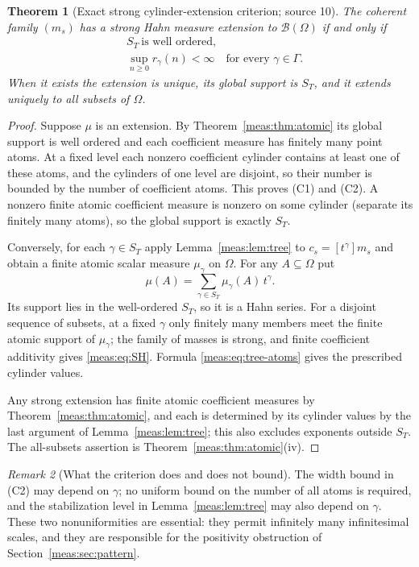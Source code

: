 \documentclass[11pt]{article}
\numberwithin{equation}{section}
\newtheorem{theorem}{Theorem}[section]
\theoremstyle{definition}
\theoremstyle{remark}
\newtheorem{remark}[theorem]{Remark}
\newcommand{\B}{\mathcal B}
\newcommand{\coef}[2]{[t^{#1}]#2}
\begin{document}
\begin{theorem}[Exact strong cylinder-extension criterion; source 10]
\label{meas:thm:cylinder}
The coherent family $(m_s)$ has a strong Hahn measure extension to
$\B(\Omega)$ if and only if
\begin{align}
 &S_T\ \text{is well ordered},\label{meas:eq:C1}\tag{C1}\\
 &\sup_{n\ge0}r_\gamma(n)<\infty\quad\text{for every }\gamma\in\Gamma.
 \label{meas:eq:C2}\tag{C2}
\end{align}
When it exists the extension is unique, its global support is $S_T$, and it
extends uniquely to all subsets of $\Omega$.
\end{theorem}
\begin{proof}
Suppose $\mu$ is an extension. By Theorem~\ref{meas:thm:atomic} its global
support is well ordered and each coefficient measure has finitely many point
atoms. At a fixed level each nonzero coefficient cylinder contains at least
one of these atoms, and the cylinders of one level are disjoint, so their
number is bounded by the number of coefficient atoms. This proves (C1) and
(C2). A nonzero finite atomic coefficient measure is nonzero on some cylinder
(separate its finitely many atoms), so the global support is exactly $S_T$.

Conversely, for each $\gamma\in S_T$ apply Lemma~\ref{meas:lem:tree} to
$c_s=\coef{\gamma}{m_s}$ and obtain a finite atomic scalar measure $\mu_\gamma$ on
$\Omega$. For any $A\subseteq\Omega$ put
\begin{equation}\label{meas:eq:construct-extension}
 \mu(A)=\sum_{\gamma\in S_T}\mu_\gamma(A)\,t^\gamma.
\end{equation}
Its support lies in the well-ordered $S_T$, so it is a Hahn series. For a
disjoint sequence of subsets, at a fixed $\gamma$ only finitely many members
meet the finite atomic support of $\mu_\gamma$; the family of masses is strong,
and finite coefficient additivity gives \eqref{meas:eq:SH}. Formula
\eqref{meas:eq:tree-atoms} gives the prescribed cylinder values.

Any strong extension has finite atomic coefficient measures by
Theorem~\ref{meas:thm:atomic}, and each is determined by its cylinder values
by the last argument of Lemma~\ref{meas:lem:tree}; this also excludes exponents
outside $S_T$. The all-subsets assertion is
Theorem~\ref{meas:thm:atomic}(iv).
\end{proof}

\begin{remark}[What the criterion does and does not bound]
The width bound in (C2) may depend on $\gamma$; no uniform bound on the number
of all atoms is required, and the stabilization level in
Lemma~\ref{meas:lem:tree} may also depend on $\gamma$. These two
nonuniformities are essential: they permit infinitely many infinitesimal
scales, and they are responsible for the positivity obstruction of
Section~\ref{meas:sec:pattern}.
\end{remark}
\end{document}
